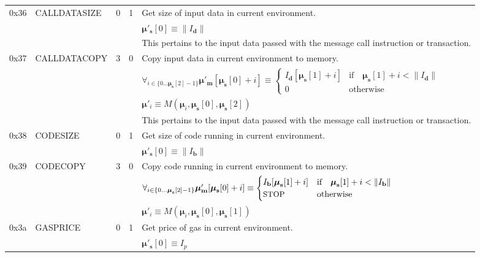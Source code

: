\documentclass[9pt,oneside]{amsart}
\begin{document}
\begin{tabular*}{\columnwidth}[h]{rlrrl}
\midrule
0x36 & {\small CALLDATASIZE} & 0 & 1 & Get size of input data in current environment. \\
&&&& $\boldsymbol{\mu}'_\mathbf{s}[0] \equiv \lVert I_\mathbf{d} \rVert$ \\
&&&& This pertains to the input data passed with the message call instruction or transaction. \\
\midrule
0x37 & {\small CALLDATACOPY} & 3 & 0 & Copy input data in current environment to memory. \\
&&&& $\forall_{i \in \{ 0 \dots \boldsymbol{\mu}_\mathbf{s}[2] - 1\} } \boldsymbol{\mu}'_\mathbf{m}[\boldsymbol{\mu}_\mathbf{s}[0] + i ] \equiv
\begin{cases} I_\mathbf{d}[\boldsymbol{\mu}_\mathbf{s}[1] + i] & \text{if} \quad \boldsymbol{\mu}_\mathbf{s}[1] + i < \lVert I_\mathbf{d} \rVert \\ 0 & \text{otherwise} \end{cases}$\\
&&&& $\boldsymbol{\mu}'_i \equiv M(\boldsymbol{\mu}_i, \boldsymbol{\mu}_\mathbf{s}[0], \boldsymbol{\mu}_\mathbf{s}[2])$ \\
&&&& This pertains to the input data passed with the message call instruction or transaction. \\
\midrule
0x38 & {\small CODESIZE} & 0 & 1 & Get size of code running in current environment. \\
&&&& $\boldsymbol{\mu}'_\mathbf{s}[0] \equiv \lVert I_\mathbf{b} \rVert$ \\
\midrule
0x39 & {\small CODECOPY} & 3 & 0 & Copy code running in current environment to memory. \\
&&&& $\forall_{i \in \{ 0 \dots \boldsymbol{\mu}_\mathbf{s}[2] - 1\} } \boldsymbol{\mu}'_\mathbf{m}[\boldsymbol{\mu}_\mathbf{s}[0] + i ] \equiv
\begin{cases} I_\mathbf{b}[\boldsymbol{\mu}_\mathbf{s}[1] + i] & \text{if} \quad \boldsymbol{\mu}_\mathbf{s}[1] + i < \lVert I_\mathbf{b} \rVert \\ \text{\small STOP} & \text{otherwise} \end{cases}$\\
&&&& $\boldsymbol{\mu}'_i \equiv M(\boldsymbol{\mu}_i, \boldsymbol{\mu}_\mathbf{s}[0], \boldsymbol{\mu}_\mathbf{s}[1])$ \\
\midrule
0x3a & {\small GASPRICE} & 0 & 1 & Get price of gas in current environment. \\
&&&& $\boldsymbol{\mu}'_\mathbf{s}[0] \equiv I_p$ \\

\end{tabular*}
\end{document}
